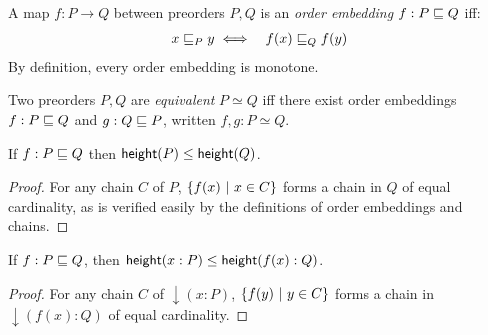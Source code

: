 \documentclass{article}
\newcommand{\ordle}{\ale}
\newcommand{\ordeq}{\simeq}
\newcommand{\height}{\ms{height}}
\newcommand{\elemheight}[2]{\height(#2 : #1)}
\newcommand{\down}[2]{\mathop{\downarrow}(#2 : #1)}
\begin{document}
\begin{definition}\label{def:ordinj}
  A map $f : P \to Q$ between preorders $P,Q$ is an \emph{order embedding} $f :
  P \ordle Q$ iff:
  \begin{eqnarray*}
    x \sqsubseteq_P y &\iff& f(x) \sqsubseteq_Q f(y)
  \end{eqnarray*}
  By definition, every order embedding is monotone.
\end{definition}

\begin{definition}\label{def:ordeq}
  Two preorders $P,Q$ are \emph{equivalent} $P \ordeq Q$ iff there exist
  order embeddings $f : P \ordle Q$ and $g : Q \ordle P$, written $f,g : P
  \ordeq Q$.
\end{definition}



\begin{theorem}\label{thm:height-le}
  If $f : P \sqsubseteq Q$ then $\height(P) \le \height(Q)$.
\end{theorem}
\begin{proof}
  For any chain $C$ of $P$, $\{{f(x)}~|~{x \in C}\}$ forms a chain in $Q$ of
  equal cardinality, as is verified easily by the definitions of order
  embeddings and chains.
\end{proof}

\begin{theorem}
  \label{thm:elemheight-le}
  If $f : P \ordle Q$, then $\elemheight{P}{x} \le \elemheight{Q}{f(x)}$.
\end{theorem}
\begin{proof}
  For any chain $C$ of $\down{P}{x}$, $\{{f(y)}~|~{y \in C}\}$ forms a chain in
  $\down{Q}{f(x)}$ of equal cardinality.
\end{proof}
\end{document}
